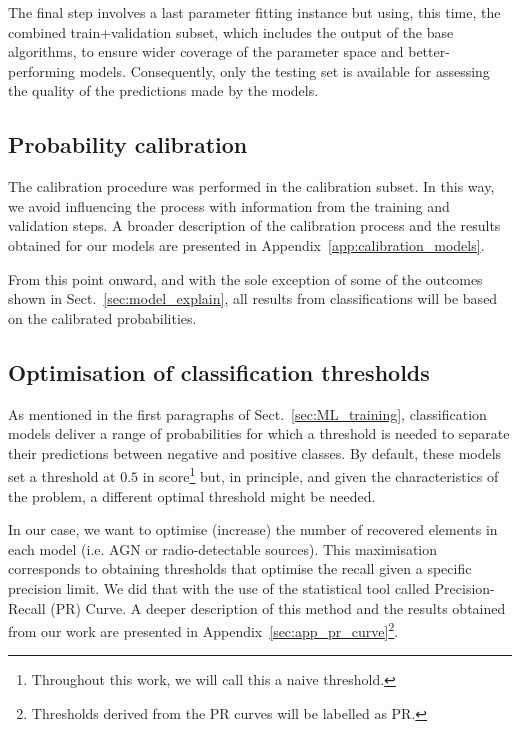 \documentclass{aa}
\begin{document}
The final step involves a last parameter fitting instance but using, this time, the combined train+validation subset, which includes the output of the base algorithms, to ensure wider coverage of the parameter space and better-performing models. Consequently, only the testing set is available for assessing the quality of the predictions made by the models.

\subsection{Probability calibration}\label{sec:prob_calibration}

The calibration procedure was performed in the calibration subset. In this way, we avoid influencing the process with information from the training and validation steps. A broader description of the calibration process and the results obtained for our models are presented in Appendix~\ref{app:calibration_models}.

From this point onward, and with the sole exception of some of the outcomes shown in Sect.~\ref{sec:model_explain}, all results from classifications will be based on the calibrated probabilities.

\subsection{Optimisation of classification thresholds}\label{sec:threshold_opt}

As mentioned in the first paragraphs of Sect.~\ref{sec:ML_training}, classification models deliver a range of probabilities for which a threshold is needed to separate their predictions between negative and positive classes. By default, these models set a threshold at $0.5$ in score\footnote{Throughout this work, we will call this a naive threshold.} but, in principle, and given the characteristics of the problem, a different optimal threshold might be needed.

In our case, we want to optimise (increase) the number of recovered elements in each model (i.e. AGN or radio-detectable sources). This maximisation corresponds to obtaining thresholds that optimise the recall given a specific precision limit. We did that with the use of the statistical tool called Precision-Recall (PR) Curve. A deeper description of this method and the results obtained from our work are presented in Appendix~\ref{sec:app_pr_curve}\footnote{Thresholds derived from the PR curves will be labelled as PR.}.
\end{document}
